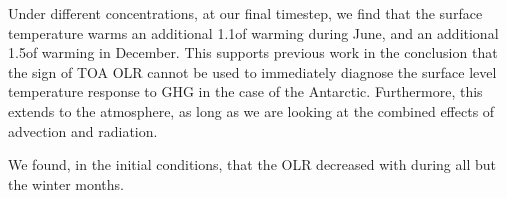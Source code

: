 \documentclass[12]{article}
\begin{document}
Under different  concentrations, at our final timestep, we find that the surface temperature warms an additional 1.1\degree of warming during June, and an additional 1.5\degree of warming in December. This supports previous work in the conclusion that the sign of TOA OLR cannot be used to immediately diagnose the surface level temperature response to GHG in the case of the Antarctic. Furthermore, this extends to the atmosphere, as long as we are looking at the combined effects of advection and radiation.

We found, in the initial conditions, that the OLR decreased with  during all but the winter months. 

\pagebreak


\end{document}
